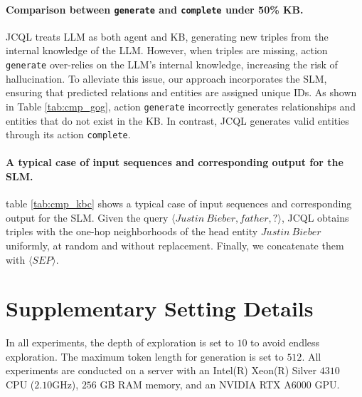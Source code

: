 \paragraph{\textbf{Comparison between \texttt{generate} and \texttt{complete} under 50\% KB.}}
JCQL treats LLM as both agent and KB, generating new triples from the internal knowledge of the LLM. However, when triples are missing, action \texttt{generate} over-relies on the LLM's internal knowledge, increasing the risk of hallucination. To alleviate this issue, our approach incorporates the SLM, ensuring that predicted relations and entities are assigned unique IDs. As shown in Table \ref{tab:cmp_gog}, action \texttt{generate} incorrectly generates relationships and entities that do not exist in the KB. In contrast, JCQL generates valid entities through its action \texttt{complete}.
\paragraph{\textbf{A typical case of input sequences and corresponding output for the SLM.}} table \ref{tab:cmp_kbc} shows a typical case of input sequences and corresponding output for the SLM. Given the query $\langle Justin\ Bieber, f ather, ? \rangle$, JCQL obtains triples with the one-hop neighborhoods of the head entity $Justin\ Bieber$ uniformly, at random and without replacement. Finally, we concatenate them with $\langle SEP \rangle$.






\section{Supplementary Setting Details} \label{appendix:implementation_details}
In all experiments, the depth of exploration is set to $10$ to avoid endless exploration. The maximum token length for generation is set to $512$. All experiments are conducted on a server with an Intel(R) Xeon(R) Silver $4310$ CPU ($2.10$GHz), $256$ GB RAM memory, and an NVIDIA RTX A6000 GPU.

